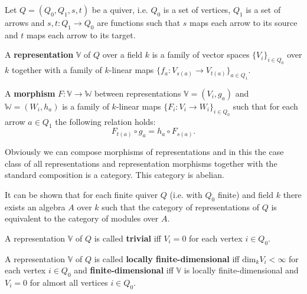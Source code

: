 \documentclass[12pt]{article}
\begin{document}
Let $Q=(Q_0, Q_1, s, t)$ be a quiver, i.e. $Q_0$ is a set of vertices, $Q_1$ is a set of arrows and $s,t:Q_1\to Q_0$ are functions such that $s$ maps each arrow to its source and $t$ maps each arrow to its target.

A \textbf{representation} $\mathbb{V}$ of $Q$ over a field $k$ is a family of vector spaces $\{V_i\}_{i\in Q_0}$ over $k$ together with a family of $k$-linear maps $\{f_a:V_{s(a)}\to V_{t(a)}\}_{a\in Q_1}$.

A \textbf{morphism} $F:\mathbb{V}\to\mathbb{W}$ between representations $\mathbb{V}=(V_i,g_a)$ and $\mathbb{W}=(W_i,h_a)$ is a family of $k$-linear maps $\{F_i:V_i\to W_i\}_{i\in Q_0}$ such that for each arrow $a\in Q_1$ the following relation holds:
$$F_{t(a)}\circ g_{a} = h_{a}\circ F_{s(a)}.$$

Obviously we can compose morphisms of representations and in this the case class of all representations and representation morphisms together with the standard composition is a category. This category is abelian. 

It can be shown that for each finite quiver $Q$ (i.e. with $Q_0$ finite) and field $k$ there exists an algebra $A$ over $k$ such that the category of representations of $Q$ is equivalent to the category of modules over $A$.

A representation $\mathbb{V}$ of $Q$ is called \textbf{trivial} iff $V_i=0$ for each vertex $i\in Q_0$.

A representation $\mathbb{V}$ of $Q$ is called \textbf{locally finite-dimensional} iff $\mathrm{dim}_k V_i<\infty$ for each vertex $i\in Q_0$ and \textbf{finite-dimensional} iff $\mathbb{V}$ is locally finite-dimensional and $V_i=0$ for almost all vertices $i\in Q_0$.
\end{document}
